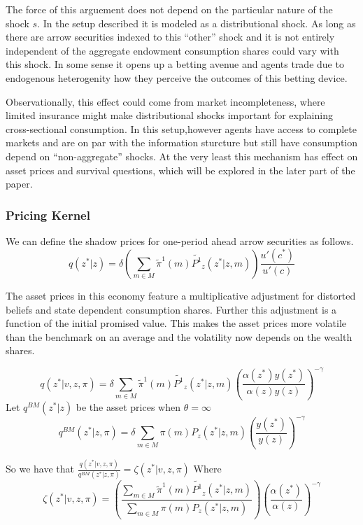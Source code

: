 \documentclass[12pt]{article}
\begin{document}
\noindent The force of this arguement does not depend on the particular nature of the shock $s$. In the setup described it is modeled as a distributional shock. As long as there are arrow securities indexed to this ``other'' shock and it is not entirely independent of the aggregate endowment consumption shares could vary with this shock. In some sense it opens up a betting avenue and agents trade due to endogenous heterogenity how they perceive the outcomes of this betting device. 

\noindent Observationally, this effect could come from market incompleteness, where limited insurance might make distributional shocks important for explaining cross-sectional consumption. In this setup,however agents have access to complete markets and are on par with the information sturcture but still have consumption depend on ``non-aggregate'' shocks. At the very least this mechanism has effect on asset prices and survival questions, which will be explored in the later part of the paper.

\subsubsection{Pricing Kernel}
\label{sec-Pricing Kernel}
\noindent  We can define the shadow prices for one-period ahead arrow securities as follows.
\[q(z^* |z )=\delta \left(\sum_{m \in M}\tilde{\pi}^1(m)\tilde{P^1}_z(z^* |z,m)\right)\frac{ u'(c^*)}{u'(c)}\]

\noindent The asset prices in this economy feature a multiplicative adjustment for distorted beliefs and state dependent consumption shares. Further this adjustment is a function of the initial promised value. This makes the asset prices more volatile than the benchmark on an average and the volatility now depends on the wealth shares.

\[q(z^* |v,z,\pi)=\delta \sum_{m \in M}\tilde{\pi}^{1}(m)\tilde{P^1}_z(z^* |z,m)\left(\frac{\alpha(z^*)y(z^*)}{\alpha(z)y(z)}\right)^{-\gamma}\]
Let $q^{BM}(z^*|z)$ be the asset prices when $\theta=\infty$
\[q^{BM}(z^*|z,\pi) = \delta \sum_{m \in M}{\pi(m)P_{z}(z^*|z,m)} \left(\frac{y(z^*)}{y(z)}\right)^{-\gamma}\]

So we have that $\frac{q(z^*|v,z,\pi)}{q^{BM}(z^*|z,\pi)}=\zeta(z^*|v,z,\pi)$
Where 
\[\zeta(z^*|v,z,\pi)=\left(\frac{\sum_{m \in M}\tilde{\pi}^{1}(m)\tilde{P^1}_z(z^* |z,m)}{\sum_{m \in M}{\pi(m)P_{z}(z^*|z,m)}} \right)\left(\frac{\alpha(z^*)}{\alpha(z)}\right)^{-\gamma} \]
\end{document}
